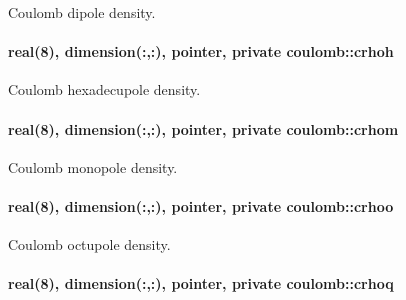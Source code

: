 Coulomb dipole density. 

\paragraph[{\texorpdfstring{crhoh}{crhoh}}]{\setlength{\rightskip}{0pt plus 5cm}real(8), dimension(\+:,\+:), pointer, private coulomb\+::crhoh\hspace{0.3cm}{\ttfamily [private]}}\hypertarget{namespacecoulomb_a56407c554275cc11a67a47980763d288}{}\label{namespacecoulomb_a56407c554275cc11a67a47980763d288}


Coulomb hexadecupole density. 

\paragraph[{\texorpdfstring{crhom}{crhom}}]{\setlength{\rightskip}{0pt plus 5cm}real(8), dimension(\+:,\+:), pointer, private coulomb\+::crhom\hspace{0.3cm}{\ttfamily [private]}}\hypertarget{namespacecoulomb_aaace1db6c4f56843a8d8e0704b938705}{}\label{namespacecoulomb_aaace1db6c4f56843a8d8e0704b938705}


Coulomb monopole density. 

\paragraph[{\texorpdfstring{crhoo}{crhoo}}]{\setlength{\rightskip}{0pt plus 5cm}real(8), dimension(\+:,\+:), pointer, private coulomb\+::crhoo\hspace{0.3cm}{\ttfamily [private]}}\hypertarget{namespacecoulomb_a2815a44e5c576913488ddb7b3e67324d}{}\label{namespacecoulomb_a2815a44e5c576913488ddb7b3e67324d}


Coulomb octupole density. 

\paragraph[{\texorpdfstring{crhoq}{crhoq}}]{\setlength{\rightskip}{0pt plus 5cm}real(8), dimension(\+:,\+:), pointer, private coulomb\+::crhoq\hspace{0.3cm}{\ttfamily [private]}}\hypertarget{namespacecoulomb_afc907325042890495f83d5596ab1deb7}{}\label{namespacecoulomb_afc907325042890495f83d5596ab1deb7}


